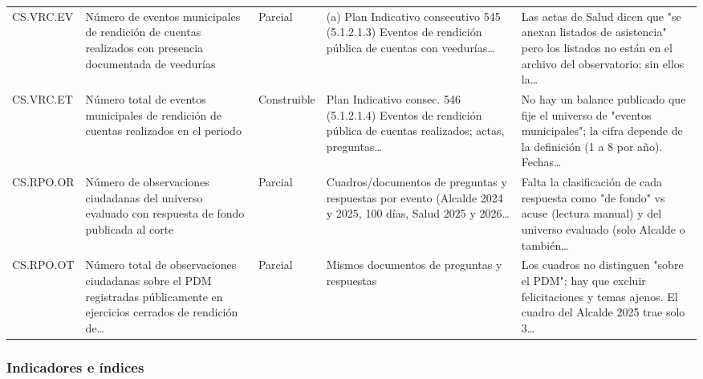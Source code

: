 \documentclass[11pt,letterpaper]{article}
\begin{document}
{\begin{xltabular}{\linewidth}{L{1.9cm}YL{1.9cm}YY}
CS.VRC.EV & Número de eventos municipales de rendición de cuentas realizados con presencia documentada de veedurías & Parcial & (a) Plan Indicativo consecutivo 545 (5.1.2.1.3) Eventos de rendición pública de cuentas con veedurías\ldots{} & Las actas de Salud dicen que "se anexan listados de asistencia" pero los listados no están en el archivo del observatorio; sin ellos la\ldots{} \\
CS.VRC.ET & Número total de eventos municipales de rendición de cuentas realizados en el periodo & Construible & Plan Indicativo consec. 546 (5.1.2.1.4) Eventos de rendición pública de cuentas realizados; actas, preguntas\ldots{} & No hay un balance publicado que fije el universo de "eventos municipales"; la cifra depende de la definición (1 a 8 por año). Fechas\ldots{} \\
CS.RPO.OR & Número de observaciones ciudadanas del universo evaluado con respuesta de fondo publicada al corte & Parcial & Cuadros/documentos de preguntas y respuestas por evento (Alcalde 2024 y 2025, 100 días, Salud 2025 y 2026\ldots{} & Falta la clasificación de cada respuesta como "de fondo" vs acuse (lectura manual) y del universo evaluado (\textquestiondown{}solo Alcalde o también\ldots{} \\
CS.RPO.OT & Número total de observaciones ciudadanas sobre el PDM registradas públicamente en ejercicios cerrados de rendición de\ldots{} & Parcial & Mismos documentos de preguntas y respuestas & Los cuadros no distinguen "sobre el PDM"; hay que excluir felicitaciones y temas ajenos. El cuadro del Alcalde 2025 trae solo 3\ldots{} \\
\end{xltabular}
}

\par{}\par

\subsubsection*{Indicadores e índices}
\end{document}
